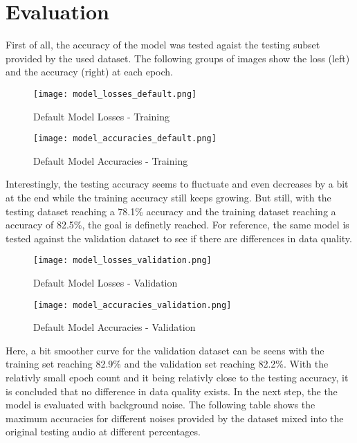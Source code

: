 \chapter{Evaluation}

First of all, the accuracy of the model was tested agaist the testing subset provided by the used dataset. The following groups of images show the loss (left) and
the accuracy (right) at each epoch.

\begin{figure}[H]
\centering
\begin{minipage}{.45\textwidth}
  \centering
  \texttt{[image: model\_losses\_default.png]}
  \caption{Default Model Losses - Training}
\end{minipage}
\begin{minipage}{.45\textwidth}
  \centering
  \texttt{[image: model\_accuracies\_default.png]}
  \caption{Default Model Accuracies - Training}
\end{minipage}
\end{figure}

Interestingly, the testing accuracy seems to fluctuate and even decreases by a bit at the end while the training accuracy still keeps growing. But still, with
the testing dataset reaching a 78.1\% accuracy and the training dataset reaching a accuracy of 82.5\%, the goal is definetly reached. For reference, the same model
is tested against the validation dataset to see if there are differences in data quality.

\begin{figure}[H]
\centering
\begin{minipage}{.45\textwidth}
  \centering
  \texttt{[image: model\_losses\_validation.png]}
  \caption{Default Model Losses - Validation}
\end{minipage}
\begin{minipage}{.45\textwidth}
  \centering
  \texttt{[image: model\_accuracies\_validation.png]}
  \caption{Default Model Accuracies - Validation}
\end{minipage}
\end{figure}

Here, a bit smoother curve for the validation dataset can be seens with the training set reaching 82.9\% and the validation set reaching 82.2\%. With the relativly small epoch
count and it being relativly close to the testing accuracy, it is concluded that no difference in data quality exists. In the next step, the the model is evaluated
with background noise. The following table shows the maximum accuracies for different noises provided by the dataset mixed into the original testing audio at different percentages.

